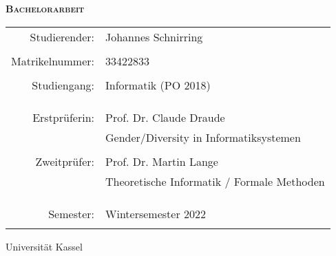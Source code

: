 \begin{titlepage}
    \centering
    {\scshape\Huge \thesisTitle \par}
    \vspace{1cm}
    {\scshape\Large \textbf{Bachelorarbeit}\par}
    \vspace{1.5cm}
    \begin{tabular}{r l}
        {\Large Studierender:}   & {\Large Johannes Schnirring}                     \\ \\
        {\Large Matrikelnummer:} & {\Large 33422833}                                \\ \\
        {\Large Studiengang:}    & {\Large Informatik (PO 2018) }                   \\ \\ \\ \\
        {\Large Erstprüferin:}   & {\Large Prof. Dr. Claude Draude }                \\
                                 & {\Large Gender/Diversity in Informatiksystemen } \\ \\
        {\Large Zweitprüfer:}    & {\Large Prof. Dr. Martin Lange }               \\
                                 & {\Large Theoretische Informatik / Formale Methoden }                   \\ \\ \\ \\
        {\Large Semester:}       & {\Large Wintersemester 2022}                     \\ \\
    \end{tabular}
    \vfill
    {\large Universität Kassel}
\end{titlepage}